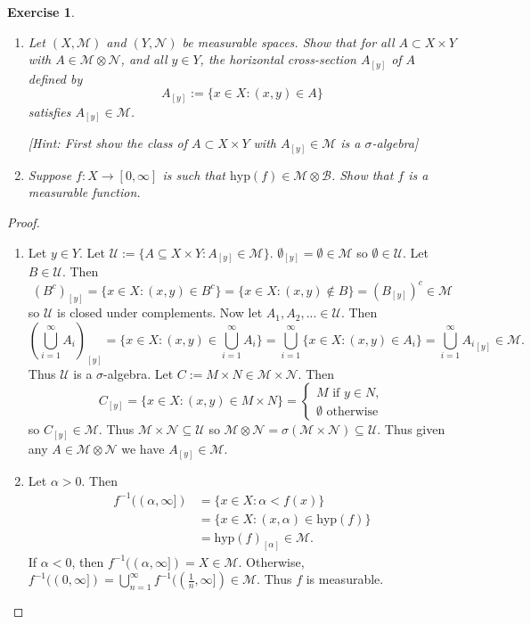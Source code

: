 \documentclass{article}
\newtheorem{exercise}[theorem]{Exercise}
\begin{document}
\begin{exercise}
\begin{enumerate}
\item[(a)] Let \((X, \mathcal{M})\) and \((Y, \mathcal{N})\) be measurable spaces. Show that for all \( A \subset X \times Y \) with \( A \in \mathcal{M} \otimes \mathcal{N} \), and all \( y \in Y \), the horizontal cross-section \( A_{[y]} \) of \( A \) defined by
    \[
    A_{[y]} := \{x \in X : (x, y) \in A\}
    \]
    satisfies \( A_{[y]} \in \mathcal{M} \). 
    
    [\textit{Hint: First show the class of \( A \subset X \times Y \) with \( A_{[y]} \in \mathcal{M} \) is a \(\sigma\)-algebra}]
    
\item[(b)] Suppose \( f : X \to [0, \infty] \) is such that \( \text{hyp}(f) \in \mathcal{M} \otimes \mathcal{B} \). Show that \( f \) is a measurable function.
\end{enumerate}
\end{exercise}
\begin{proof}
\begin{enumerate}
    \item[(a)] Let $y\in Y$. Let $\mathcal{U}:=\{A\subseteq X\times Y:A_{[y]}\in \mathcal{M}\}$. $\emptyset_{[y]}=\emptyset\in\mathcal{M}$ so $\emptyset\in\mathcal{U}$. Let $B\in\mathcal{U}$. Then \[(B^c)_{[y]}=\{x\in X:(x,y)\in B^c\}=\{x\in X:(x,y)\not\in B\}=(B_{[y]})^c\in\mathcal{M}\] so $\mathcal{U}$ is closed under complements. Now let $A_1,A_2,...\in\mathcal{U}$. Then \[(\bigcup_{i=1}^\infty A_i)_{[y]}=\{x\in X:(x,y)\in\bigcup_{i=1}^\infty A_i\}=\bigcup_{i=1}^\infty\{x\in X:(x,y)\in A_i\}=\bigcup_{i=1}^\infty {A_i}_{[y]}\in\mathcal{M}.\] Thus $\mathcal{U}$ is a $\sigma$-algebra. Let $C:=M\times N\in\mathcal{M}\times\mathcal{N}$. Then \[C_{[y]}=\{x\in X:(x,y)\in M\times N\}=\begin{cases}
        M\text{ if }y\in N,\\
        \emptyset\text{ otherwise}
    \end{cases}\]so $C_{[y]}\in\mathcal{M}$. Thus $\mathcal{M}\times\mathcal{N}\subseteq\mathcal{U}$ so $\mathcal{M}\otimes\mathcal{N}=\sigma(\mathcal{M}\times\mathcal{N})\subseteq \mathcal{U}$. Thus given any $A\in\mathcal{M}\otimes\mathcal{N}$ we have $A_{[y]}\in\mathcal{M}$.
    \item[(b)] Let $\alpha>0$. Then \begin{align*}f^{-1}((\alpha,\infty])&=\{x\in X:\alpha<f(x)\}\\&=\{x\in X:(x,\alpha)\in\text{hyp}(f)\}\\&=\text{hyp}(f)_{[\alpha]}\in\mathcal{M}.\end{align*} If $\alpha<0$, then $f^{-1}((\alpha,\infty])=X\in\mathcal{M}$. Otherwise, $f^{-1}((0,\infty])=\bigcup_{n=1}^\infty f^{-1}((\frac{1}{n},\infty])\in\mathcal{M}$. Thus $f$ is measurable.
\end{enumerate}
\end{proof}
\end{document}
